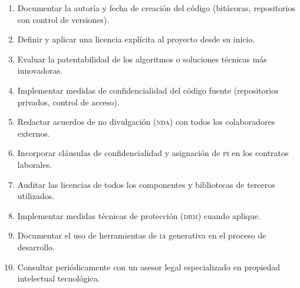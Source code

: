 \documentclass[11pt,a4paper]{report}
\begin{document}
\begin{enumerate}[leftmargin=*, label=\arabic*.]
    \item Documentar la autoría y fecha de creación del código (bitácoras, repositorios con control de versiones).
    \item Definir y aplicar una licencia explícita al proyecto desde su inicio.
    \item Evaluar la patentabilidad de los algoritmos o soluciones técnicas más innovadoras.
    \item Implementar medidas de confidencialidad del código fuente (repositorios privados, control de acceso).
    \item Redactar acuerdos de no divulgación (\textsc{nda}) con todos los colaboradores externos.
    \item Incorporar cláusulas de confidencialidad y asignación de \textsc{pi} en los contratos laborales.
    \item Auditar las licencias de todos los componentes y bibliotecas de terceros utilizados.
    \item Implementar medidas técnicas de protección (\textsc{drm}) cuando aplique.
    \item Documentar el uso de herramientas de \textsc{ia} generativa en el proceso de desarrollo.
    \item Consultar periódicamente con un asesor legal especializado en propiedad intelectual tecnológica.
\end{enumerate}

%
%
%
%
%
%
%
%
%
%
%
%
%
\end{document}
